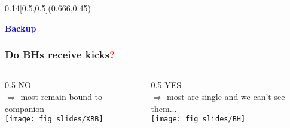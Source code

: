 \documentclass[xcolor=dvipsnames,professionalfonts, aspectratio=169]{beamer}
\begin{document}
\appendix

\bgroup
{}
\begin{frame}[plain]%
  \begin{textblock}{0.14}[0.5,0.5](0.666,0.45)
    \begin{block}{}
      \centering
      \textcolor{Blue}{\Large \bf Backup}
    \end{block}
  \end{textblock}
\end{frame}
\egroup

\begin{frame}[c]
  \frametitle{Do BHs receive kicks\textcolor{red}{\bf ?}}
  \vspace*{5pt}
  \begin{columns}
    \begin{column}{0.5\textwidth}
      \centering
      {\Huge NO}\\
      {$\Rightarrow$ most remain bound to companion}\\[20pt]
      \texttt{[image: fig\_slides/XRB]}
    \end{column}
    \begin{column}{0.5\textwidth}
      \centering
      {\Huge YES}\\
      {$\Rightarrow$ most are single and we can't see them...}\\[20pt]
      \texttt{[image: fig\_slides/BH]}
  \end{column}
\end{columns}


\end{frame}
\end{document}
